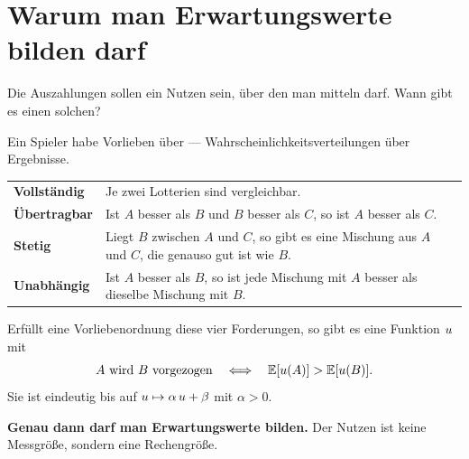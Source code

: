 \section{Warum man Erwartungswerte bilden darf}

\begin{merksatz}
Die Auszahlungen sollen ein Nutzen sein, über den man mitteln darf. Wann gibt es einen solchen?

Ein Spieler habe Vorlieben über  --- Wahrscheinlichkeitsverteilungen über Ergebnisse.

\begin{center}
{\small
\renewcommand{\arraystretch}{1.55}
\begin{tabular}{@{}P{2.4cm}P{6.2cm}@{}}
\toprule
\textbf{Vollständig} & Je zwei Lotterien sind vergleichbar.\\
\textbf{Übertragbar} & Ist $A$ besser als $B$ und $B$ besser als $C$, so ist $A$ besser als $C$.\\
\textbf{Stetig} & Liegt $B$ zwischen $A$ und $C$, so gibt es eine Mischung aus $A$ und $C$, die genauso gut ist wie $B$.\\
\textbf{Unabhängig} & Ist $A$ besser als $B$, so ist jede Mischung mit $A$ besser als dieselbe Mischung mit $B$.\\
\bottomrule
\end{tabular}}
\end{center}

Erfüllt eine Vorliebenordnung diese vier Forderungen, so gibt es eine Funktion $u$ mit
\[ A \text{ wird } B \text{ vorgezogen} \quad\Longleftrightarrow\quad \mathbb{E}[u(A)] > \mathbb{E}[u(B)] . \]
Sie ist eindeutig bis auf $u \mapsto \alpha\,u + \beta$ mit $\alpha > 0$.

\begin{center}
\begin{minipage}{0.9\textwidth}
\textbf{Genau dann darf man Erwartungswerte bilden.} Der Nutzen ist keine Messgröße, sondern eine Rechengröße.
\end{minipage}
\end{center}

\begin{center}
\begin{minipage}{0.88\textwidth}
\end{minipage}
\end{center}
\end{merksatz}

